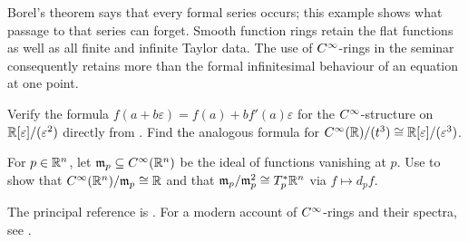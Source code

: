 Borel's theorem says that every formal series occurs; this example
shows what passage to that series can forget. Smooth function rings
retain the flat functions as well as all finite and infinite Taylor data.
The use of $C^\infty$-rings in the seminar consequently retains more than
the formal infinitesimal behaviour of an equation at one point.

\begin{exercise}
Verify the formula $f(a+b\varepsilon)=f(a)+bf'(a)\varepsilon$ for the
$C^\infty$-structure on $\mathbb{R}[\varepsilon]/(\varepsilon^2)$ directly from
. Find the analogous formula for
$C^\infty(\mathbb{R})/(t^3)\cong\mathbb{R}[\varepsilon]/(\varepsilon^3)$.
\end{exercise}

\begin{exercise}
For $p\in\mathbb{R}^n$, let $\mathfrak m_p\subseteq C^\infty(\mathbb{R}^n)$ be the ideal of
functions vanishing at $p$. Use  to show that
$C^\infty(\mathbb{R}^n)/\mathfrak m_p\cong\mathbb{R}$ and that
$\mathfrak m_p/\mathfrak m_p^2\cong T_p^*\mathbb{R}^n$ via $f\mapsto d_pf$.
\end{exercise}

The principal reference is
\cite[Chapter~I, Section~1]{Moerdijk_Reyes_Smooth_Infinitesimal_Analysis}.
For a modern account of $C^\infty$-rings and their spectra, see
\cite[Sections~2--3]{Joyce_Introduction_Cinfty_Schemes}.
